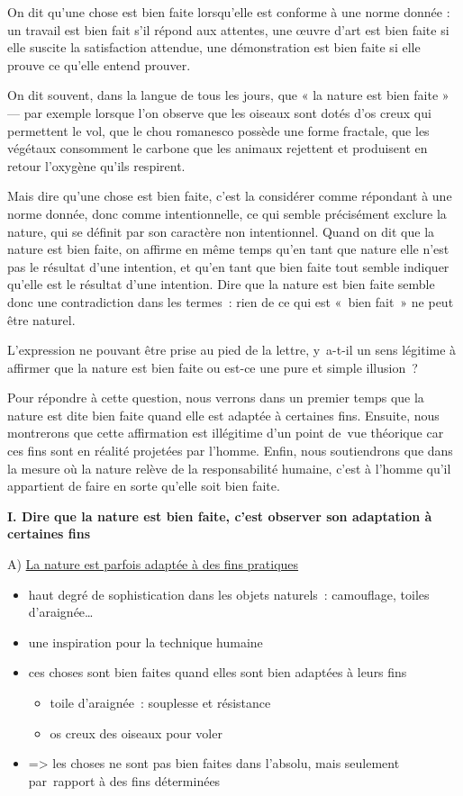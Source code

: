 \documentclass[a4paper,12pt]{article}
\begin{document}
On dit qu'une chose est bien faite lorsqu'elle est conforme à une norme
donnée : un travail est bien fait s'il répond aux attentes, une œuvre
d'art est bien faite si elle suscite la satisfaction attendue, une
démonstration est bien faite si elle prouve ce qu'elle entend prouver.

On dit souvent, dans la langue de tous les
jours, que « la nature est bien faite » — par exemple lorsque l'on
observe que les oiseaux sont dotés d'os creux qui permettent le vol, que
le chou romanesco possède une forme fractale, que les végétaux
consomment le carbone que les animaux rejettent et produisent en retour
l'oxygène qu'ils respirent.

Mais dire qu'une chose est bien faite, c'est la
considérer comme répondant à une norme donnée, donc comme
intentionnelle, ce qui semble précisément exclure la nature, qui se
définit par son caractère non intentionnel. Quand on dit que la nature
est bien faite, on affirme en même temps qu'en tant que nature elle
n'est pas le résultat d'une intention, et qu'en tant que bien faite tout
semble indiquer qu'elle est le résultat d'une intention. Dire que la
nature est bien faite semble donc une contradiction dans les termes :
rien de ce qui est « bien fait » ne peut être naturel.

L'expression ne pouvant être prise au pied de
la lettre, y a-t-il un sens légitime à affirmer que la nature est bien
faite ou est-ce une pure et simple illusion ?

Pour répondre à cette question, nous verrons dans un
premier temps que la nature est dite bien faite quand elle est adaptée à
certaines fins. Ensuite, nous montrerons que cette affirmation est
illégitime d'un point de vue théorique car ces fins sont en réalité
projetées par l'homme. Enfin, nous soutiendrons que dans la mesure où la
nature relève de la responsabilité humaine, c'est à l'homme qu'il
appartient de faire en sorte qu'elle soit bien faite.

\bigskip

\textbf{I. Dire que la nature est bien faite, c'est observer son adaptation à
certaines fins}


\medskip

A) \uline{La nature est parfois adaptée à des fins pratiques}
\begin{itemize}
\item haut degré de sophistication dans les objets naturels : camouflage,
toiles d'araignée\ldots{}
\item une inspiration pour la technique humaine
\item ces choses sont bien faites quand elles sont bien adaptées à leurs
fins
\begin{itemize}
\item toile d'araignée : souplesse et résistance
\item os creux des oiseaux pour voler
\end{itemize}
\item => les choses ne sont pas bien faites dans l'absolu, mais seulement
par rapport à des fins déterminées
\end{itemize}
\end{document}
